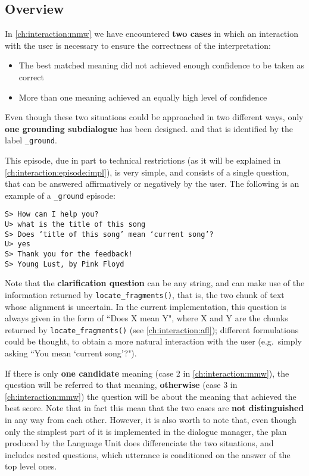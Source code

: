 \subsection{Overview}
In \ref{ch:interaction:mmw} we have encountered \textbf{two cases} in which an interaction with the user is necessary to ensure the correctness of the interpretation:
\begin{itemize}
	\item The best matched meaning did not achieved enough confidence to be taken as correct
	\item More than one meaning achieved an equally high level of confidence
\end{itemize}

Even though these two situations could be approached in two different ways, only \textbf{one grounding subdialogue} has been designed. and that is identified by the label \texttt{\_ground}.

This episode, due in part to technical restrictions (as it will be explained in \ref{ch:interaction:episode:impl}), is very simple, and consists of a single question, that can be answered affirmatively or negatively by the user. The following is an example of a \texttt{\_ground} episode:

\texttt{S> How can I help you? \\
U> what is the title of this song \\
S> Does `title of this song' mean `current song'? \\
U> yes \\
S> Thank you for the feedback! \\
S> Young Lust, by Pink Floyd}

Note that the \textbf{clarification question} can be any string, and can make use of the information returned by \texttt{locate\_fragments()}, that is, the two chunk of text whose alignment is uncertain. In the current implementation, this question is always given in the form of ``Does X mean Y", where X and Y are the chunks returned by \texttt{locate\_fragments()} (see \ref{ch:interaction:afl}); different formulations could be thought, to obtain a more natural interaction with the user (e.g.\ simply asking ``You mean `current song'?").

If there is only \textbf{one candidate} meaning (case 2 in \ref{ch:interaction:mmw}), the question will be referred to that meaning, \textbf{otherwise} (case 3 in \ref{ch:interaction:mmw}) the question will be about the meaning that achieved the best score. Note that in fact this mean that the two cases are \textbf{not distinguished} in any way from each other. However, it is also worth to note that, even though only the simplest part of it is implemented in the dialogue manager, the plan produced by the Language Unit does differenciate the two situations, and includes nested questions, which utterance is conditioned on the answer of the top level ones.

